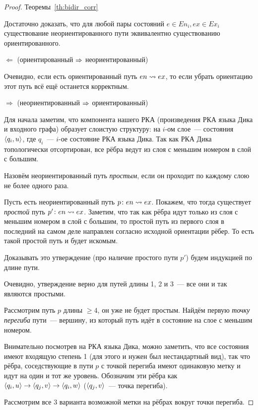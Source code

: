 \begin{proof}{Теоремы~\ref{th:bidir_corr}}

  Достаточно доказать, что для любой пары состояний $e \in En_i, ex \in Ex_i$ существование неориентированного пути эквивалентно существованию ориентированного.

  $\Leftarrow$ (ориентированный $\Rightarrow$ неориентированный)

  Очевидно, если есть ориентированный путь $en \rightsquigarrow ex$, то если убрать ориентацию этот путь всё ещё останется корректным.

  $\Rightarrow$ (неориентированный $\Rightarrow$ ориентированный)

  Для начала заметим, что компонента нашего РКА (произведения РКА языка Дика и входного графа) образует слоистую структуру: на $i$-ом слое~--- состояния $\langle q_i, u \rangle$, где $q_i$~--- $i$-ое состояние РКА языка Дика. Так как РКА Дика топологически отсортирован, все рёбра ведут из слоя с меньшим номером в слой с большим.

  Назовём неориентированный путь \textit{простым}, если он проходит по каждому слою не более одного раза.

  Пусть есть неориентированный путь $p \colon en \rightsquigarrow ex$. Покажем, что тогда существует \textit{простой} путь $p' \colon en \rightsquigarrow ex$. Заметим, что так как рёбра идут только из слоя с меньшим номером в слой с большим, то простой путь из первого слоя в последний на самом деле направлен согласно исходной ориентации рёбер. То есть такой простой путь и будет искомым.

  Доказывать это утверждение (про наличие простого пути $p'$) будем индукцией по длине пути.

  Очевидно, утверждение верно для путей длины 1, 2 и 3~--- все они и так являются простыми.

  Рассмотрим путь $p$ длины $\ge 4$, он уже не будет простым. Найдём первую \textit{точку перегиба} пути~--- вершину, из который путь идёт в состояние на слое с меньшим номером.

  Внимательно посмотрев на РКА языка Дика, можно заметить, что все состояния имеют входящую степень 1 (для этого и нужен был нестандартный вид), так что рёбра, соседствующие в пути $p$ с точкой перегиба имеют одинаковую метку и идут на один и тот же уровень. Обозначим эти рёбра как $\langle q_i, u \rangle \rightarrow \langle q_j, v \rangle \rightarrow \langle q_i, w \rangle$ ($\langle q_j, v \rangle$~--- точка перегиба).

  Рассмотрим все 3 варианта возможной метки на рёбрах вокруг точки перегиба.


\end{proof}
